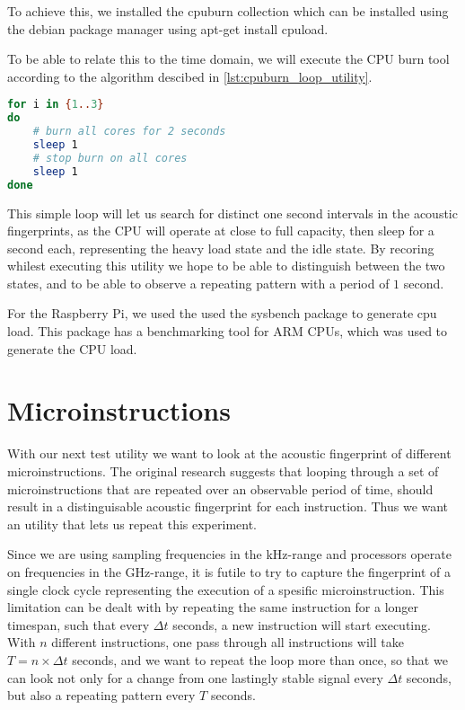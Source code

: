 To achieve this, we installed the cpuburn collection which can be installed using the debian package manager using
apt-get install cpuload. 

To be able to relate this to the time domain, we will execute the CPU burn tool according to the algorithm descibed in \autoref{lst:cpuburn_loop_utility}.

\begin{lstlisting}[language=BASH, caption={Mapping execution to the time domain: CPU Burn Utility}, label={lst:cpuburn_loop_utility}]
for i in {1..3}
do
	# burn all cores for 2 seconds
	sleep 1
	# stop burn on all cores
	sleep 1
done
\end{lstlisting}

This simple loop will let us search for distinct one second intervals in the acoustic fingerprints, as the CPU will operate at close to full capacity, then sleep for a second each, representing the heavy load state and the idle state.
By recoring whilest executing this utility we hope to be able to distinguish between the two states, and to be able to observe a repeating pattern with a period of \(1\) second.

For the Raspberry Pi, we used the used the sysbench package to generate cpu load. 
This package has a benchmarking tool for ARM CPUs, which was used to generate the CPU load. 

\section{Microinstructions}
With our next test utility we want to look at the acoustic fingerprint of different microinstructions. 
The original  research suggests that looping through a set of microinstructions that are repeated over an observable period of time, should result in a distinguisable acoustic fingerprint for each instruction.
Thus we want an utility that lets us repeat this experiment. 

Since we are using sampling frequencies in the kHz-range and processors operate on frequencies in the GHz-range, it is futile to try to capture the fingerprint of a single clock cycle representing the execution of a spesific microinstruction. 
This limitation can be dealt with by repeating the same instruction for a longer timespan, such that every \(\Delta t\) seconds, a new instruction will start executing.
With \(n\) different instructions, one pass through all instructions will take \(T = n \times \Delta t\) seconds, and we want to repeat the loop more than once, so that we can look not only for a change from one lastingly stable signal every \(\Delta t\) seconds, but also a repeating pattern every \(T\) seconds.

